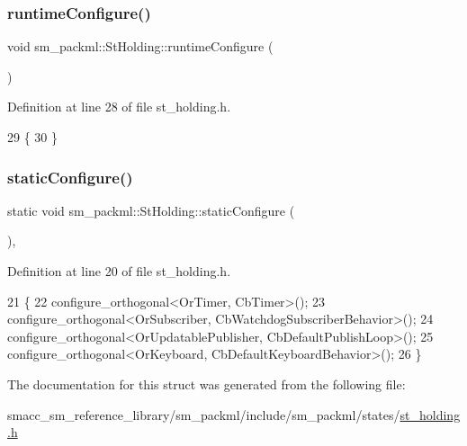 \subsubsection{\texorpdfstring{runtime\+Configure()}{runtimeConfigure()}}
{\footnotesize\ttfamily void sm\+\_\+packml\+::\+St\+Holding\+::runtime\+Configure (\begin{DoxyParamCaption}{ }\end{DoxyParamCaption})\hspace{0.3cm}{\ttfamily [inline]}}



Definition at line 28 of file st\+\_\+holding.\+h.


\begin{DoxyCode}
29     \{
30     \}
\end{DoxyCode}
\mbox{\label{structsm__packml_1_1StHolding_a22319b4c87a56cbaa2e3baefd6c2f035}} 
\subsubsection{\texorpdfstring{static\+Configure()}{staticConfigure()}}
{\footnotesize\ttfamily static void sm\+\_\+packml\+::\+St\+Holding\+::static\+Configure (\begin{DoxyParamCaption}{ }\end{DoxyParamCaption})\hspace{0.3cm}{\ttfamily [inline]}, {\ttfamily [static]}}



Definition at line 20 of file st\+\_\+holding.\+h.


\begin{DoxyCode}
21     \{
22         configure\_orthogonal<OrTimer, CbTimer>();   
23         configure\_orthogonal<OrSubscriber, CbWatchdogSubscriberBehavior>();
24         configure\_orthogonal<OrUpdatablePublisher, CbDefaultPublishLoop>();
25         configure\_orthogonal<OrKeyboard, CbDefaultKeyboardBehavior>();
26     \}
\end{DoxyCode}


The documentation for this struct was generated from the following file\+:\begin{DoxyCompactItemize}
\item 
smacc\+\_\+sm\+\_\+reference\+\_\+library/sm\+\_\+packml/include/sm\+\_\+packml/states/\hyperlink{st__holding_8h}{st\+\_\+holding.\+h}\end{DoxyCompactItemize}
